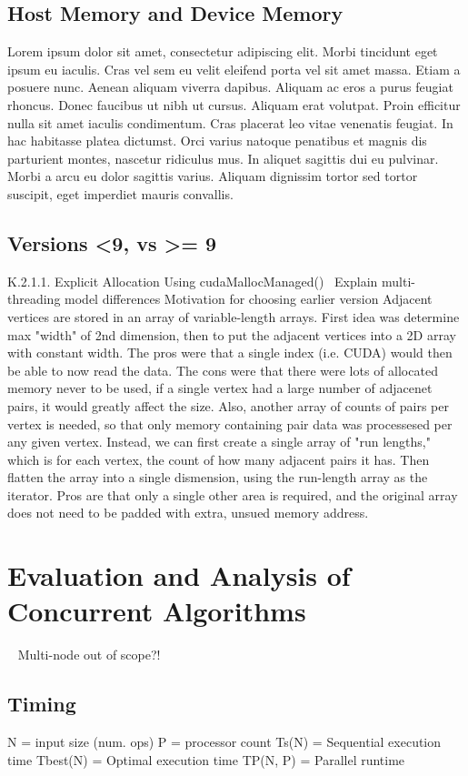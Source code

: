 \subsection{Host Memory and Device Memory}
Lorem ipsum dolor sit amet, consectetur adipiscing elit. Morbi tincidunt eget 
ipsum eu iaculis. Cras vel sem eu velit eleifend porta vel sit amet massa. Etiam 
a posuere nunc. Aenean aliquam viverra dapibus. Aliquam ac eros a purus feugiat 
rhoncus. Donec faucibus ut nibh ut cursus. Aliquam erat volutpat. Proin efficitur 
nulla sit amet iaculis condimentum. Cras placerat leo vitae venenatis feugiat. In 
hac habitasse platea dictumst. Orci varius natoque penatibus et magnis dis 
parturient montes, nascetur ridiculus mus. In aliquet sagittis dui eu pulvinar. 
Morbi a arcu eu dolor sagittis varius. Aliquam dignissim tortor sed tortor 
suscipit, eget imperdiet mauris convallis.~\cite[p.~00]{todoCitation}\todoCitation
%
\subsection{Versions <9, vs >= 9}
K.2.1.1. Explicit Allocation Using cudaMallocManaged()~\cite[p.~272]{CUDA18} 
Explain multi-threading model differences Motivation for choosing earlier 
version Adjacent vertices are stored in an array of variable-length arrays. 
First idea was determine max "width" of 2nd dimension, then to put the adjacent 
vertices into a 2D array with constant width. The pros were that a single index 
(i.e. CUDA) would then be able to now read the data.  The cons were that there 
were lots of allocated memory never to be used, if a single vertex had a large 
number of adjacenet pairs, it would greatly affect the size. Also, another 
array of counts of pairs per vertex is needed, so that only memory containing 
pair data was processesed per any given vertex. Instead, we can first create a 
single array of "run lengths," which is for each vertex, the count of how many 
adjacent pairs it has. Then flatten the array into a single dismension, using 
the run-length array as the iterator. Pros are that only a single other area is 
required, and the original array does not need to be padded with extra, unsued 
memory address.
%
%
%
\section{Evaluation and Analysis of Concurrent Algorithms}~\cite[p.~330]{Lang17}
Multi-node out of scope?!
%
\subsection{Timing}
	N = input size (num. ops)
	P = processor count
	Ts(N) = Sequential execution time
	Tbest(N) = Optimal execution time
	TP(N, P) = Parallel runtime
%
